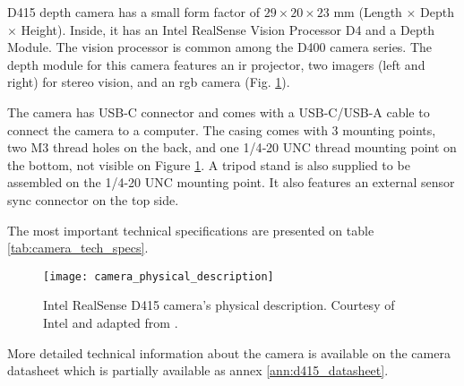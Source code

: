 D415 depth camera has a small form factor of $29 \times 20 \times 23$ \si{\milli\meter} (Length $\times$ Depth $\times$ Height). Inside, it has an Intel\textregistered{} RealSense\texttrademark{} Vision Processor D4 and a Depth Module. The vision processor is common among the D400 camera series. The depth module for this camera features an \gls{ir} projector, two imagers (left and right) for stereo vision, and an \gls{rgb} camera (Fig. \ref{fig:camera_physical_description}).

The camera has USB-C connector and comes with a USB-C/USB-A cable to connect the camera to a computer. The casing comes with 3 mounting points, two M3 thread holes on the back, and one 1/4‑20 UNC thread mounting point on the bottom, not visible on Figure \ref{fig:camera_physical_description}. A tripod stand is also supplied to be assembled on the 1/4-20 UNC mounting point. It also features an external sensor sync connector on the top side.

The most important technical specifications are presented on table \ref{tab:camera_tech_specs}.\\

\begin{figure}[htbp]
	\centering
	\texttt{[image: camera\_physical\_description]}
	\caption[Intel\textregistered{} RealSense\texttrademark{} D415 camera's physical description.]{Intel\textregistered{} RealSense\texttrademark{} D415 camera's physical description. Courtesy of Intel\textregistered{} and adapted from \cite{IntelRealSense_depth_camera_d415}.}
	\label{fig:camera_physical_description}
\end{figure}

More detailed technical information about the camera is available on the camera datasheet which is partially available as annex \ref{ann:d415_datasheet}.

